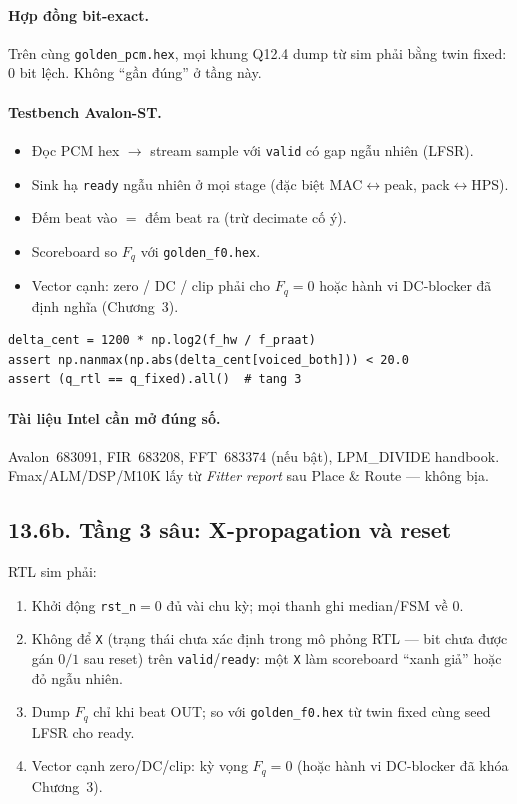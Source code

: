 \paragraph{Hợp đồng bit-exact.} Trên cùng \texttt{golden\_pcm.hex}, mọi khung Q12.4 dump từ sim phải bằng twin fixed: $0$ bit lệch. Không ``gần đúng'' ở tầng này.

\paragraph{Testbench Avalon-ST.}
\begin{itemize}[leftmargin=1.4em]
    \item Đọc PCM hex $\to$ stream sample với \texttt{valid} có gap ngẫu nhiên (LFSR).
    \item Sink hạ \texttt{ready} ngẫu nhiên ở mọi stage (đặc biệt MAC$\leftrightarrow$peak, pack$\leftrightarrow$HPS).
    \item Đếm beat vào $=$ đếm beat ra (trừ decimate cố ý).
    \item Scoreboard so $F_q$ với \texttt{golden\_f0.hex}.
    \item Vector cạnh: zero / DC / clip phải cho $F_q=0$ hoặc hành vi DC-blocker đã định nghĩa (Chương~3).
\end{itemize}

\begin{verbatim}
delta_cent = 1200 * np.log2(f_hw / f_praat)
assert np.nanmax(np.abs(delta_cent[voiced_both])) < 20.0
assert (q_rtl == q_fixed).all()  # tang 3
\end{verbatim}

\paragraph{Tài liệu Intel cần mở đúng số.} Avalon~683091, FIR~683208, FFT~683374 (nếu bật), LPM\_DIVIDE handbook. Fmax/ALM/DSP/M10K lấy từ \emph{Fitter report} sau Place \& Route --- không bịa.

\subsection*{13.6b. Tầng 3 sâu: X-propagation và reset}

RTL sim phải:
\begin{enumerate}[leftmargin=1.4em]
  \item Khởi động \texttt{rst\_n}$=0$ đủ vài chu kỳ; mọi thanh ghi median/FSM về $0$.
  \item Không để \texttt{X} (trạng thái chưa xác định trong mô phỏng RTL --- bit chưa được gán $0/1$ sau reset) trên \texttt{valid}/\texttt{ready}: một \texttt{X} làm scoreboard ``xanh giả'' hoặc đỏ ngẫu nhiên.
  \item Dump $F_q$ chỉ khi beat OUT; so với \texttt{golden\_f0.hex} từ twin fixed cùng seed LFSR cho ready.
  \item Vector cạnh zero/DC/clip: kỳ vọng $F_q=0$ (hoặc hành vi DC-blocker đã khóa Chương~3).
\end{enumerate}

